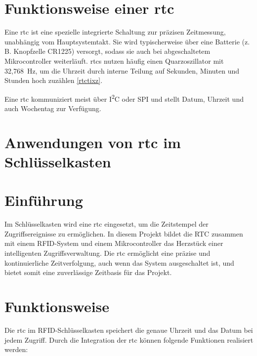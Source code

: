 \section{Funktionsweise einer \ac{rtc}}

Eine \ac{rtc} ist eine spezielle integrierte Schaltung zur präzisen Zeitmessung, unabhängig vom Hauptsystemtakt. Sie wird typischerweise über eine Batterie (z.\,B. Knopfzelle CR1225) versorgt, sodass sie auch bei abgeschaltetem Mikrocontroller weiterläuft. \ac{rtc}s nutzen häufig einen Quarzoszillator mit 32{,}768~Hz, um die Uhrzeit durch interne Teilung auf Sekunden, Minuten und Stunden hoch zuzählen \ref{rtctixz}.

Eine \ac{rtc} kommuniziert meist über I\textsuperscript{2}C oder SPI und stellt Datum, Uhrzeit und auch Wochentag zur Verfügung. \cite{monk2017}



\section{Anwendungen von \ac{rtc} im Schlüsselkasten}

\section{Einführung}

Im Schlüsselkasten wird eine \ac{rtc} eingesetzt, um die Zeitstempel der Zugriffsereignisse zu ermöglichen. In diesem Projekt bildet die RTC zusammen mit einem RFID-System und einem Mikrocontroller das Herzstück einer intelligenten Zugriffsverwaltung. Die \ac{rtc} ermöglicht eine präzise und kontinuierliche Zeitverfolgung, auch wenn das System ausgeschaltet ist, und bietet somit eine zuverlässige Zeitbasis für das Projekt. \cite{monk2017}

\section{Funktionsweise}
Die \ac{rtc} im RFID-Schlüsselkasten speichert die genaue Uhrzeit und das Datum bei jedem Zugriff. Durch die Integration der \ac{rtc} können folgende Funktionen realisiert werden:

